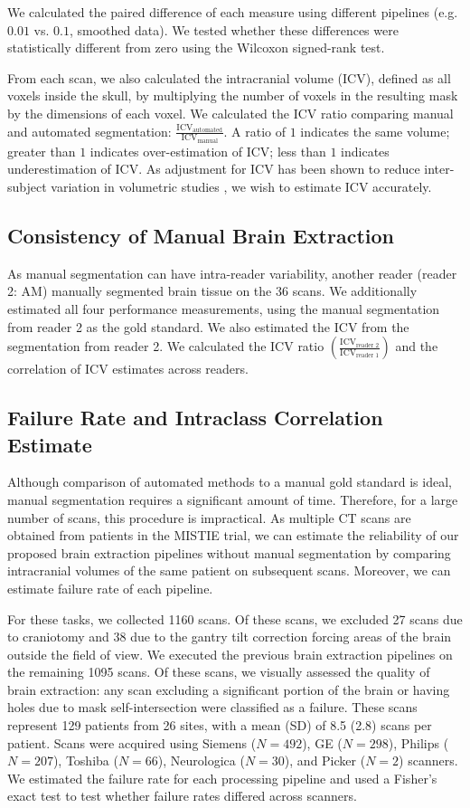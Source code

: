 We calculated the paired difference of each measure using different pipelines (e.g. $0.01$ vs. $0.1$, smoothed data).  We tested whether these differences were statistically different from zero using the Wilcoxon signed-rank test.

From each scan, we also calculated the intracranial volume (ICV), defined as all voxels inside the skull, by multiplying the number of voxels in the resulting mask by the dimensions of each voxel.  We calculated the ICV ratio comparing manual and automated segmentation: $\frac{\text{ICV}_{\text{automated}}}{\text{ICV}_{\text{manual}}}$.  A ratio of $1$ indicates the same volume; greater than $1$ indicates over-estimation of ICV; less than $1$ indicates underestimation of ICV.  As adjustment for ICV has been shown to reduce inter-subject variation in volumetric studies \citep{whitwell2001normalization}, we wish to estimate ICV accurately. 


\subsection{Consistency of Manual Brain Extraction}
As manual segmentation can have intra-reader variability, another reader (reader 2: AM) manually segmented brain tissue on the 36 scans.  We additionally estimated all four performance measurements, using the manual segmentation from reader 2 as the gold standard.  We also estimated the ICV from the segmentation from reader 2.   We calculated the ICV ratio $\left(\frac{\text{ICV}_{\text{reader 2}}}{\text{ICV}_{\text{reader 1}}}\right)$ and the correlation of ICV estimates across readers.

\subsection{Failure Rate and Intraclass Correlation Estimate}
Although comparison of automated methods to a manual gold standard is ideal, manual segmentation requires a significant amount of time.  Therefore, for a large number of scans, this procedure is impractical.  As multiple CT scans are obtained from patients in the MISTIE trial, we can estimate the reliability of our proposed brain extraction pipelines without manual segmentation by comparing intracranial volumes of the same patient on subsequent scans.  Moreover, we can estimate failure rate of each pipeline.  

For these tasks, we collected 1160 scans.  Of these scans, we excluded 27 scans due to craniotomy and 38 due to the gantry tilt correction forcing areas of the brain outside the field of view.   We executed the previous brain extraction pipelines on the remaining 1095 scans.  Of these scans, we visually assessed the quality of brain extraction: any scan excluding a significant portion of the brain or having holes due to mask self-intersection were classified as a failure.  These scans represent 129 patients from 26 sites, with a mean (SD) of 8.5 (2.8) scans per patient.  Scans were acquired using Siemens ($N=492$), GE ($N=298$), Philips ($N=207$), Toshiba ($N=66$), Neurologica ($N=30$), and Picker ($N=2$) scanners.  We estimated the failure rate for each processing pipeline and used a Fisher's exact test to test whether failure rates differed across scanners.


